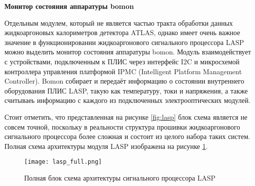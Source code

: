 \textbf{Монитор состояния аппаратуры bomon}\par
Отдельным модулем, который не является частью тракта обработки данных жидкоаргоновых калориметров детектора ATLAS, однако имеет очень важное значение в функционировании жидкоаргонового сигнального процессора LASP можно выделить монитор состояния аппаратуры bomon. Модуль взаимодействует с устройствами, подключенным к ПЛИС через интерфейс I2C и микросхемой контроллера управления платформой IPMC (Intelligent Platform Management Controller). Bomon собирает и передаёт информацию о состоянии внутреннего оборудования ПЛИС LASP, такую как температуру, токи и напряжения, а также считываеь информацию с каждого из подключенных электрооптических модулей.\par
Стоит отметить, что представленная на рисунке \ref{fig:lasp} блок схема является не совсем точной, поскольку в реальности структура прошивки жидкоаргонового сигнального процессора более сложная и состоит из целого набора таких систем. Полная схема архитектуры модуля LASP изображена на рисунке \ref{fig:lasp_full}.\par

\begin{figure}[ht]
    \centering
    \texttt{[image: lasp\_full.png]}
    \caption{Полная блок схема архитектуры сигнального процессора LASP}
    \label{fig:lasp_full}
\end{figure}\par


